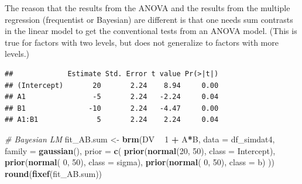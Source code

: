 \documentclass[12pt,]{krantz}
\newenvironment{Shaded}{\begin{snugshade}}{\end{snugshade}}
\newcommand{\KeywordTok}[1]{\textcolor[rgb]{0.13,0.29,0.53}{\textbf{#1}}}
\newcommand{\DataTypeTok}[1]{\textcolor[rgb]{0.13,0.29,0.53}{#1}}
\newcommand{\DecValTok}[1]{\textcolor[rgb]{0.00,0.00,0.81}{#1}}
\newcommand{\StringTok}[1]{\textcolor[rgb]{0.31,0.60,0.02}{#1}}
\newcommand{\CommentTok}[1]{\textcolor[rgb]{0.56,0.35,0.01}{\textit{#1}}}
\newcommand{\OperatorTok}[1]{\textcolor[rgb]{0.81,0.36,0.00}{\textbf{#1}}}
\newcommand{\NormalTok}[1]{#1}
\theoremstyle{definition}
\theoremstyle{definition}
\theoremstyle{definition}
\theoremstyle{remark}
\begin{document}
The reason that the results from the ANOVA and the results from the
multiple regression (frequentist or Bayesian) are different is that one
needs sum contrasts in the linear model to get the conventional tests
from an ANOVA model. (This is true for factors with two levels, but does
not generalize to factors with more levels.)

\begin{Shaded}
\end{Shaded}

\begin{verbatim}
##             Estimate Std. Error t value Pr(>|t|)
## (Intercept)       20       2.24    8.94     0.00
## A1                -5       2.24   -2.24     0.04
## B1               -10       2.24   -4.47     0.00
## A1:B1              5       2.24    2.24     0.04
\end{verbatim}

\begin{Shaded}
\begin{Highlighting}[]
\CommentTok{# Bayesian LM}
\NormalTok{fit_AB.sum <-}\StringTok{ }\KeywordTok{brm}\NormalTok{(DV }\OperatorTok{~}\StringTok{ }\DecValTok{1} \OperatorTok{+}\StringTok{ }\NormalTok{A}\OperatorTok{*}\NormalTok{B,}
                 \DataTypeTok{data =}\NormalTok{ df_simdat4,}
                 \DataTypeTok{family =} \KeywordTok{gaussian}\NormalTok{(),}
                 \DataTypeTok{prior =} \KeywordTok{c}\NormalTok{(}
                     \KeywordTok{prior}\NormalTok{(}\KeywordTok{normal}\NormalTok{(}\DecValTok{20}\NormalTok{, }\DecValTok{50}\NormalTok{), }\DataTypeTok{class =}\NormalTok{ Intercept),}
                     \KeywordTok{prior}\NormalTok{(}\KeywordTok{normal}\NormalTok{( }\DecValTok{0}\NormalTok{, }\DecValTok{50}\NormalTok{), }\DataTypeTok{class =}\NormalTok{ sigma),}
                     \KeywordTok{prior}\NormalTok{(}\KeywordTok{normal}\NormalTok{( }\DecValTok{0}\NormalTok{, }\DecValTok{50}\NormalTok{), }\DataTypeTok{class =}\NormalTok{ b)}
\NormalTok{                 )) }
\KeywordTok{round}\NormalTok{(}\KeywordTok{fixef}\NormalTok{(fit_AB.sum))}
\end{Highlighting}
\end{Shaded}
\end{document}
